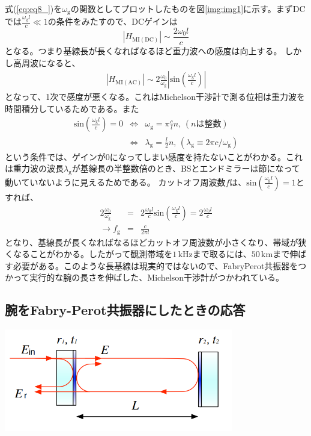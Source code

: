 式(\ref{eq:eq8_})を$\omega_{\mathrm{g}}$の関数としてプロットしたものを図\ref{img:img1}に示す。まずDCでは$\frac{\omega_{\mathrm{g}}l}{c}\ll1$の条件をみたすので、DCゲインは
\begin{equation}
  |H_{\mathrm{MI(DC)}}|\sim\frac{2\omega_{0}l}{c}
\end{equation}
となる。つまり基線長が長くなればなるほど重力波への感度は向上する。
しかし高周波になると、
\begin{eqnarray}
  |H_{\mathrm{MI(AC)}}| \sim 2\frac{\omega_{0}}{\omega_{\mathrm{g}}}|\mathrm{sin}(\frac{\omega_{\mathrm{g}}l}{c})|
\end{eqnarray}
となって、1次で感度が悪くなる。これはMichelson干渉計で測る位相は重力波を時間積分しているためである。また
\begin{eqnarray}
  \mathrm{sin}(\frac{\omega_{\mathrm{g}}l}{c})=0 &\Leftrightarrow& \omega_{\mathrm{g}} = \pi\frac{c}{l}n, \, (nは整数)\\
 &\Leftrightarrow& \lambda_{\mathrm{g}} = \frac{l}{2} n, \,(\lambda_{\mathrm{g}} \equiv 2\pi{c}/\omega_{\mathrm{g}})
\end{eqnarray}
という条件では、ゲインが0になってしまい感度を持たないことがわかる。これは重力波の波長$\lambda_{\mathrm{g}}$が基線長の半整数倍のとき、BSとエンドミラーは節になって動いていないように見えるためである。
カットオフ周波数$f$は、$\mathrm{sin}(\frac{\omega_{\mathrm{g}}l}{c})=1$とすれば、
\begin{eqnarray}
  2\frac{\omega_{0}}{\omega_{\mathrm{g}}} &=& 2\frac{\omega_{0}l}{c}\mathrm{sin}(\frac{\omega_{\mathrm{g}}l}{c})=2\frac{\omega_{0}l}{c} \\
  \rightarrow f_{\mathrm{g}} &=& \frac{c}{2\pi{l}}
\end{eqnarray}
となり、基線長が長くなればなるほどカットオフ周波数が小さくなり、帯域が狭くなることがわかる。したがって観測帯域を$1\,\mathrm{kHz}$まで取るには、$50\, \mathrm{km}$まで伸ばす必要がある。このような長基線は現実的ではないので、FabryPerot共振器をつかって実行的な腕の長さを伸ばした、Michelson干渉計がつかわれている。


\subsection{腕をFabry-Perot共振器にしたときの応答}

\begin{center}
\includegraphics[width=10cm]{./ifo/FPcavity.png}
\end{center}

